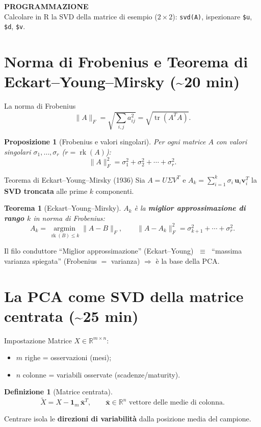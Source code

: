 \documentclass[11pt,aspectratio=169]{beamer}
\newcommand{\R}{\mathbb{R}}
\newtheorem{teorema}{Teorema}
\newtheorem{definizione}{Definizione}
\newtheorem{proposizione}{Proposizione}
\newcommand{\programmazioneslide}[1]{%
\begin{frame}[plain]
  \vfill
  \begin{center}
    \colorbox{progteal}{%
      \begin{minipage}{0.86\linewidth}
        \centering\color{white}\vspace{18pt}
        {\Huge\textbf{PROGRAMMAZIONE}}\\[16pt]
        {\Large #1}
        \vspace{18pt}
      \end{minipage}%
    }
  \end{center}
  \vfill
\end{frame}
}
\begin{document}
\programmazioneslide{Calcolare in R la SVD della matrice di esempio ($2\times 2$):
\texttt{svd(A)}, ispezionare \texttt{\$u}, \texttt{\$d}, \texttt{\$v}.}

\section{Norma di Frobenius e Teorema di Eckart--Young--Mirsky (\textasciitilde20 min)}

\begin{frame}{La norma di Frobenius}
\[
  \|A\|_F = \sqrt{\sum_{i,j} a_{ij}^2} = \sqrt{\operatorname{tr}(A^T A)}.
\]
\begin{proposizione}[Frobenius e valori singolari]
Per ogni matrice $A$ con valori singolari $\sigma_1,\ldots,\sigma_r$ ($r=\operatorname{rk}(A)$):
\[
  \|A\|_F^2 = \sigma_1^2 + \sigma_2^2 + \cdots + \sigma_r^2.
\]
\end{proposizione}
\end{frame}

\begin{frame}{Teorema di Eckart--Young--Mirsky (1936)}
Sia $A = U\Sigma V^T$ e $A_k = \sum_{i=1}^k \sigma_i\,\mathbf{u}_i\mathbf{v}_i^T$ la
\textbf{SVD troncata} alle prime $k$ componenti.
\begin{teorema}[Eckart--Young--Mirsky]
$A_k$ è la \textbf{miglior approssimazione di rango $k$} in norma di Frobenius:
\[
  A_k = \operatorname*{argmin}_{\operatorname{rk}(B)\le k} \|A-B\|_F,
  \qquad
  \|A-A_k\|_F^2 = \sigma_{k+1}^2+\cdots+\sigma_r^2.
\]
\end{teorema}
\begin{alertblock}{Il filo conduttore}
``Miglior approssimazione'' (Eckart--Young) $\;\equiv\;$ ``massima varianza spiegata''
(Frobenius $=$ varianza) $\Rightarrow$ è la base della PCA.
\end{alertblock}
\end{frame}

\section{La PCA come SVD della matrice centrata (\textasciitilde25 min)}

\begin{frame}{Impostazione}
Matrice $X \in \R^{m\times n}$:
\begin{itemize}
  \item $m$ righe = osservazioni (mesi);
  \item $n$ colonne = variabili osservate (scadenze/maturity).
\end{itemize}
\begin{definizione}[Matrice centrata]
\[
  \tilde X = X - \mathbf{1}_m\,\bar{\mathbf{x}}^T,
  \qquad \bar{\mathbf{x}} \in \R^n \text{ vettore delle medie di colonna}.
\]
\end{definizione}
Centrare isola le \textbf{direzioni di variabilità} dalla posizione media del campione.
\end{frame}
\end{document}
